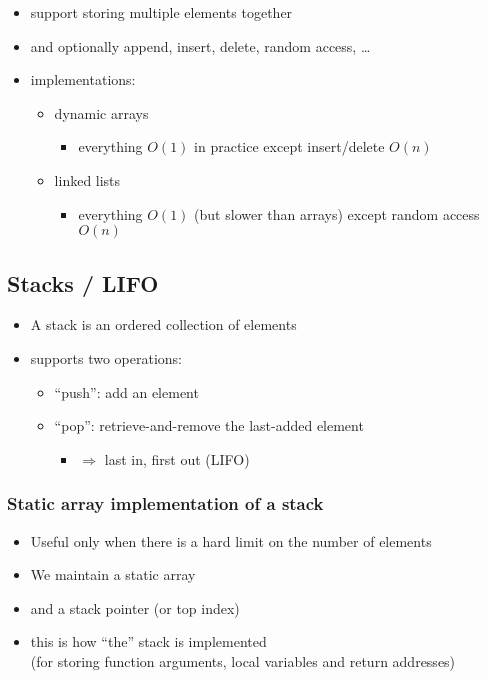 \documentclass[12pt]{article}
\begin{document}
\begin{itemize}
    \item support storing multiple elements together
    \item and optionally append, insert, delete, random access, \ldots
    \item implementations:
    \begin{itemize}
        \item dynamic arrays
        \begin{itemize}
            \item everything \(O(1)\) in practice except insert/delete \(O(n)\)
        \end{itemize}
        \item linked lists
        \begin{itemize}
            \item everything \(O(1)\) (but slower than arrays) except random access \(O(n)\)
        \end{itemize}
    \end{itemize}
\end{itemize}

\subsection{Stacks / LIFO}

\begin{itemize}
    \item A stack is an ordered collection of elements
    \item supports two operations:
    \begin{itemize}
        \item ``push'': add an element
        \item ``pop'': retrieve-and-remove the last-added element
        \begin{itemize}
            \item $\Rightarrow$ last in, first out (LIFO)
        \end{itemize}
    \end{itemize}
\end{itemize}

\subsubsection{Static array implementation of a stack}

\begin{itemize}
    \item Useful only when there is a hard limit on the number of elements
    \item We maintain a static array
    \item and a stack pointer (or top index)
    \item this is how ``the'' stack is implemented \\
    (for storing function arguments, local variables and return addresses)
\end{itemize}
\end{document}
